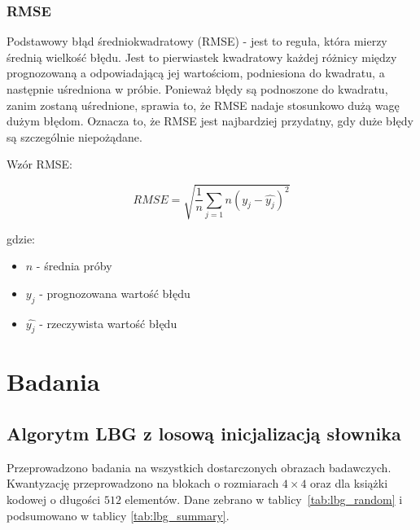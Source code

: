 \documentclass{article}
\begin{document}
\subsubsection{RMSE}

Podstawowy błąd średniokwadratowy (RMSE) - jest to reguła, która mierzy średnią wielkość błędu. Jest to pierwiastek kwadratowy każdej różnicy między prognozowaną a odpowiadającą jej wartościom, podniesiona do kwadratu, a następnie uśredniona w próbie. Ponieważ błędy są podnoszone do kwadratu, zanim zostaną uśrednione, sprawia to, że RMSE nadaje stosunkowo dużą wagę dużym błędom. Oznacza to, że RMSE jest najbardziej przydatny, gdy duże błędy są szczególnie niepożądane.

Wzór RMSE:

\begin{equation}
RMSE = \sqrt{\frac{1}{n} \sum_{j=1}{n} (y_{j} - \hat{y_{j}} )^2}
\end{equation}

gdzie:
\begin{itemize}[label=]
    \item $n$ - średnia próby
    \item $y_{j}$ - prognozowana wartość błędu
    \item $\hat{y_{j}}$ - rzeczywista wartość błędu\cite{rmse}
\end{itemize}

\section{Badania}

\subsection{Algorytm LBG z losową inicjalizacją słownika}

Przeprowadzono badania na wszystkich dostarczonych obrazach badawczych. Kwantyzację przeprowadzono na blokach o rozmiarach $4 \times 4$ oraz dla książki
kodowej o długości $512$ elementów. Dane zebrano w \mbox{tablicy \ref{tab:lbg_random}} i podsumowano w tablicy \mbox{\ref{tab:lbg_summary}}.
\end{document}
